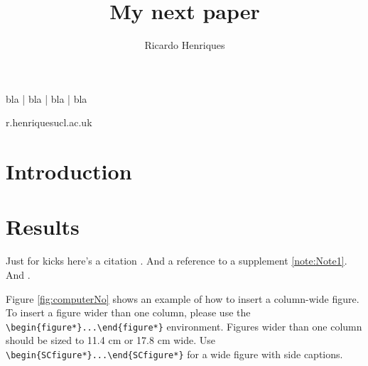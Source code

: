 \documentclass[times, twoside, watermark]{zHenriquesLab-StyleBioRxiv}
\begin{document}
\title{My next paper}

\author[1,\Letter]{Ricardo Henriques}


\maketitle

\begin{abstract}
\blindtext
\end {abstract}

\begin{keywords}
bla | bla | bla | bla
\end{keywords}

\begin{corrauthor}
r.henriques\at ucl.ac.uk
\end{corrauthor}

\section*{Introduction}
\Blindtext

\section*{Results}

Just for kicks here's a citation \cite{Gustafsson2016}. And a reference to a supplement \cref{note:Note1}. And .
\Blindtext


\Blindtext

Figure \ref{fig:computerNo} shows an example of how to insert a column-wide figure. To insert a figure wider than one column, please use the \verb|\begin{figure*}...\end{figure*}| environment. Figures wider than one column should be sized to 11.4 cm or 17.8 cm wide. Use \verb|\begin{SCfigure*}...\end{SCfigure*}| for a wide figure with side captions.
\end{document}
